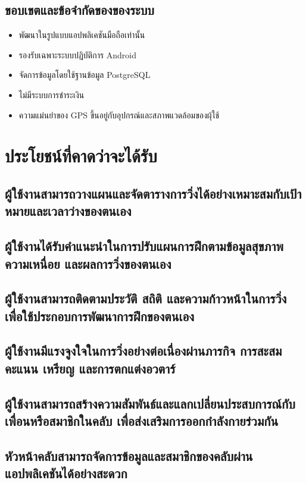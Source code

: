 \subsection{ขอบเขตและข้อจำกัดของของระบบ}
\begin{itemize}[label={-}]
    \item พัฒนาในรูปแบบแอปพลิเคชันมือถือเท่านั้น
    \item รองรับเฉพาะระบบปฏิบัติการ Android
    \item จัดการข้อมูลโดยใช้ฐานข้อมูล PostgreSQL
    \item ไม่มีระบบการชำระเงิน
    \item ความแม่นยำของ GPS ขึ้นอยู่กับอุปกรณ์และสภาพแวดล้อมของผุ้ใช้
\end{itemize}

\section{ประโยชน์ที่คาดว่าจะได้รับ}
\subsection{ผู้ใช้งานสามารถวางแผนและจัดตารางการวิ่งได้อย่างเหมาะสมกับเป้าหมายและเวลาว่างของตนเอง}

\subsection{ผู้ใช้งานได้รับคำแนะนำในการปรับแผนการฝึกตามข้อมูลสุขภาพ ความเหนื่อย และผลการวิ่งของตนเอง}

\subsection{ผู้ใช้งานสามารถติดตามประวัติ สถิติ และความก้าวหน้าในการวิ่ง เพื่อใช้ประกอบการพัฒนาการฝึกของตนเอง}

\subsection{ผู้ใช้งานมีแรงจูงใจในการวิ่งอย่างต่อเนื่องผ่านภารกิจ การสะสมคะแนน เหรียญ และการตกแต่งอวตาร์}

\subsection{ผู้ใช้งานสามารถสร้างความสัมพันธ์และแลกเปลี่ยนประสบการณ์กับเพื่อนหรือสมาชิกในคลับ เพื่อส่งเสริมการออกกำลังกายร่วมกัน}

\subsection{หัวหน้าคลับสามารถจัดการข้อมูลและสมาชิกของคลับผ่านแอปพลิเคชันได้อย่างสะดวก}
